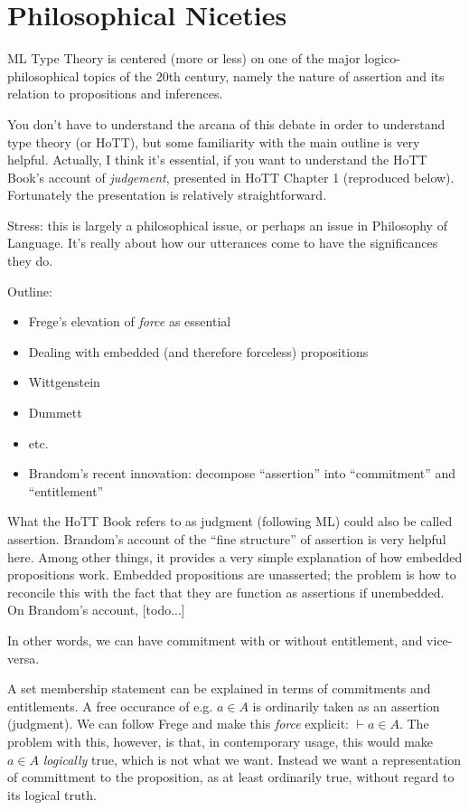 \section{Philosophical Niceties}

ML Type Theory is centered (more or less) on one of the major
logico-philosophical topics of the 20th century, namely the nature of
assertion and its relation to propositions and inferences.

You don't have to understand the arcana of this debate in order to
understand type theory (or HoTT), but some familiarity with the main
outline is very helpful.  Actually, I think it's essential, if you
want to understand the HoTT Book's account of \textit{judgement},
presented in HoTT Chapter 1 (reproduced below).  Fortunately the
presentation is relatively straightforward.

\begin{remark}
  Stress: this is largely a philosophical issue, or perhaps an issue
  in Philosophy of Language.  It's really about how our utterances
  come to have the significances they do.
\end{remark}

Outline:

\begin{itemize}
\item Frege's elevation of \textit{force} as essential
\item Dealing with embedded (and therefore forceless) propositions
\item Wittgenstein
\item Dummett
\item etc.
\item Brandom's recent innovation: decompose ``assertion'' into ``commitment'' and ``entitlement''
\end{itemize}

What the HoTT Book refers to as judgment (following ML) could also be
called assertion.  Brandom's account of the ``fine structure'' of
assertion is very helpful here.  Among other things, it provides a
very simple explanation of how embedded propositions work.  Embedded
propositions are unasserted; the problem is how to reconcile this with
the fact that they are function as assertions if unembedded.  On
Brandom's account, [todo...]

In other words, we can have commitment with or without entitlement,
and vice-versa.

A set membership statement can be explained in terms of commitments
and entitlements.  A free occurance of e.g. \(a\in A\) is ordinarily
taken as an assertion (judgment).  We can follow Frege and make this
\textit{force} explicit: \(\vdash a\in A\).  The problem with this,
however, is that, in contemporary usage, this would make \(a\in A\)
\textit{logically} true, which is not what we want.  Instead we want a
representation of committment to the proposition, as at least
ordinarily true, without regard to its logical truth.

